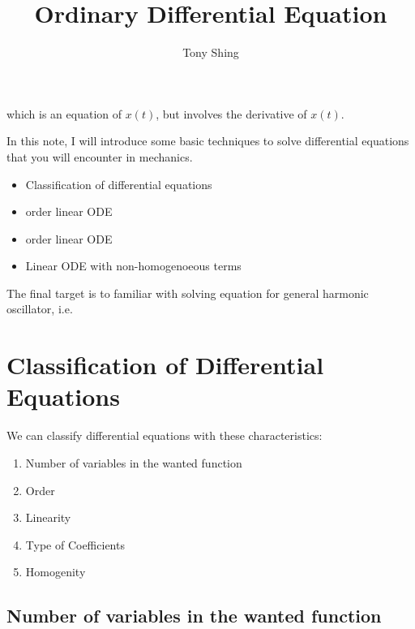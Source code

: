 \documentclass[class=article, crop=false, 12pt]{standalone}
\author{Tony Shing}
\title{Ordinary Differential Equation}
\begin{document}
\maketitle


\begin{overview}
    \begin{center}
        which is an equation of $x(t)$, but involves the  derivative of $x(t)$.
    \end{center}
    
    In this note, I will introduce some basic techniques to solve differential equations
    that you will encounter in mechanics. 
    \begin{itemize}
        \item Classification of differential equations
        \item {} order linear ODE
        \item {} order linear ODE
        \item Linear ODE with non-homogenoeous terms
    \end{itemize}

    The final target is to familiar with solving equation for general harmonic oscillator, i.e.
\end{overview}


\section{Classification of Differential Equations}

We can classify differential equations with these characteristics:
\begin{enumerate}
    \item Number of variables in the wanted function
    \item Order
    \item Linearity
    \item Type of Coefficients
    \item Homogenity
\end{enumerate}

\subsection{Number of variables in the wanted function}
\end{document}
